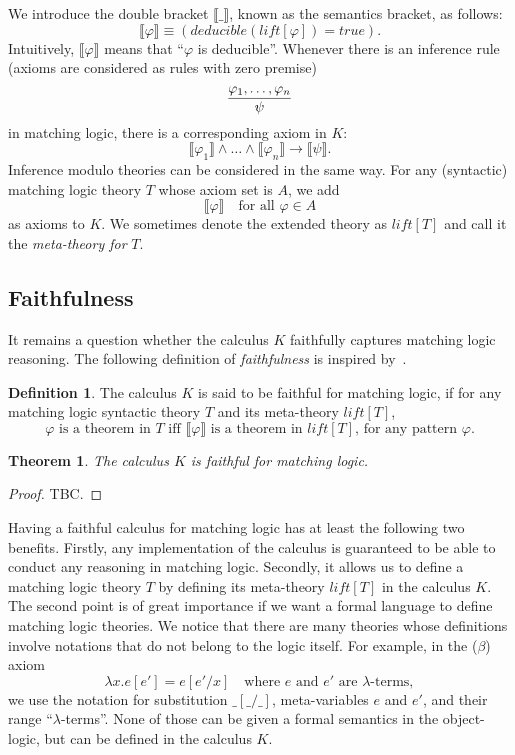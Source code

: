 \documentclass[UTF8]{article}
\newcounter{thmcounter}
\theoremstyle{plain}
\newtheorem{theorem}[thmcounter]{Theorem}
\theoremstyle{definition}
\newtheorem{definition}[thmcounter]{Definition}
\theoremstyle{remark}
\newcommand{\Bracket}[1]
    {\llbracket#1\rrbracket}
\begin{document}
We introduce the double bracket $\Bracket{\_}$, known as the semantics bracket, as follows:
\begin{equation*}
\Bracket{\varphi} \equiv 
\left(\textit{deducible}\left(\mathit{lift}[\varphi]\right) = true\right).
\end{equation*}
Intuitively, $\Bracket{\varphi}$ means that ``$\varphi$ is deducible''.
Whenever there is an inference rule (axioms are considered as rules with zero 
premise)
$$
	\infer{\psi}
	{\varphi_1,\dots,\varphi_n}
$$
in matching logic, there is a corresponding axiom in $K$:
$$
	\Bracket{\varphi_1} \wedge \dots \wedge \Bracket{\varphi_n} \to \Bracket{\psi}.
$$
Inference modulo theories can be considered in the same way. 
For any (syntactic) matching logic theory $T$ whose axiom set is $A$, we add
$$
\Bracket{\varphi} \quad \text{for all $\varphi \in A$}
$$
as axioms to $K$. We sometimes denote the extended theory as $\mathit{lift}[T]$ 
and call it 
the \emph{meta-theory for} $T$.

\subsection{Faithfulness}
It remains a question whether the calculus $K$ faithfully captures matching logic reasoning. 
The following definition of \emph{faithfulness} is inspired by~\cite{?}.
\begin{definition}
	The calculus $K$ is said to be faithful for matching logic, if for any 
	matching logic syntactic theory $T$ and its meta-theory $\mathit{lift}[T]$,
	\begin{equation*}
	  \text{$\varphi$ is a theorem in $T$ iff $\Bracket{\varphi}$ is a theorem 
	  in $\mathit{lift}[T]$, for any pattern $\varphi$.}
	\end{equation*}
\end{definition}
\begin{theorem}
	The calculus $K$ is faithful for matching logic.
\end{theorem}
\begin{proof}
	TBC.
\end{proof}

Having a faithful calculus for matching logic has at least the following two 
benefits. 
Firstly, any implementation of the calculus is guaranteed to be able to conduct 
any reasoning in matching logic. Secondly, it allows us to define a matching 
logic theory $T$ by defining its meta-theory $\mathit{lift}[T]$ in the 
calculus $K$. 
The second 
point is of great importance if we want a formal language to define matching 
logic theories. 
We notice that there are many theories whose definitions involve notations that 
do not belong to the logic itself. For example, in the ($\beta$) axiom
$$
\lambda x . e [e'] = e[e' / x] \quad \text{where $e$ and $e'$ are 
$\lambda$-terms},
$$
we use the notation for substitution $\_[\_/\_]$, meta-variables $e$ and $e'$, 
and their range ``$\lambda$-terms''. 
None of those can be given a formal semantics in the object-logic, but can be 
defined in the calculus $K$.
\end{document}
